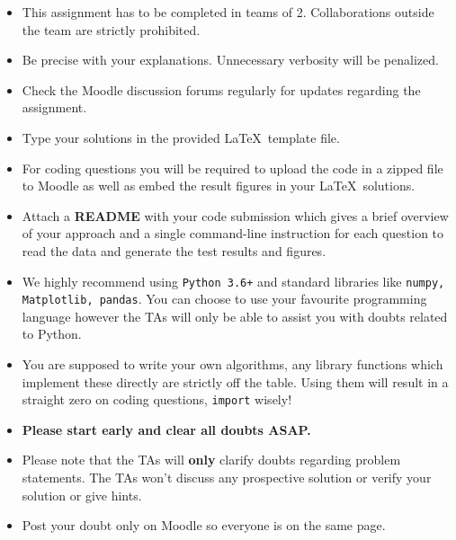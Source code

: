 \documentclass[addpoints,12pt,solution]{exam}
\begin{document}
{\small

\begin{itemize}\itemsep0mm

\item This assignment has to be completed in teams of 2. Collaborations outside the team are strictly prohibited.

\item Be precise with your explanations. Unnecessary verbosity will be penalized.

\item Check the Moodle discussion forums regularly for updates regarding the assignment.

\item Type your solutions in the provided \LaTeX ~template file.

\item For coding questions you will be required to upload the code in a zipped file to Moodle as well as embed the result figures in your \LaTeX ~solutions.

\item Attach a \textbf{README} with your code submission which gives a brief overview of your approach and a single command-line instruction for each question to read the data and generate the test results and figures. 

\item We highly recommend using \texttt{Python 3.6+} and standard libraries like \texttt{numpy, Matplotlib, pandas}. You can choose to use your favourite programming language however the TAs will only be able to assist you with doubts related to Python. 

\item You are supposed to write your own algorithms, any library functions which implement these directly are strictly off the table. Using them will result in a straight zero on coding questions, \texttt{import} wisely!

\item \textbf{Please start early and clear all doubts ASAP.}

\item Please note that the TAs will \textbf{only} clarify doubts regarding problem statements. The TAs won't discuss any prospective solution or verify your solution or give hints.  

\item Post your doubt only on Moodle so everyone is on the same page.

\end{itemize}
}
\end{document}
